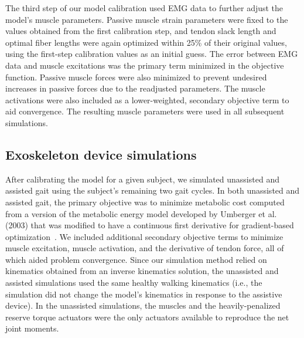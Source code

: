 \documentclass[10pt,letterpaper]{article}
\begin{document}
The third step of our model calibration used EMG data to further adjust the model’s muscle parameters. Passive muscle strain parameters were fixed to the values obtained from the first calibration step, and tendon slack length and optimal fiber lengths were again optimized within 25\% of their original values, using the first-step calibration values as an initial guess. The error between EMG data and muscle excitations was the primary term minimized in the objective function. Passive muscle forces were also minimized to prevent undesired increases in passive forces due to the readjusted parameters. The muscle activations were also included as a lower-weighted, secondary objective term to aid convergence. The resulting muscle parameters were used in all subsequent simulations.

\subsection*{Exoskeleton device simulations}
After calibrating the model for a given subject, we simulated unassisted and assisted gait using the subject’s remaining two gait cycles. In both unassisted and assisted gait, the primary objective was to minimize metabolic cost computed from a version of the metabolic energy model developed by Umberger et al. (2003) that was modified to have a continuous first derivative for gradient-based optimization~\cite{Umberger:2003, Koelewijn:2018}. We included additional secondary objective terms to minimize muscle excitation, muscle activation, and the derivative of tendon force, all of which aided problem convergence. Since our simulation method relied on kinematics obtained from an inverse kinematics solution, the unassisted and assisted simulations used the same healthy walking kinematics (i.e., the simulation did not change the model's kinematics in response to the assistive device). In the unassisted simulations, the muscles and the heavily-penalized reserve torque actuators were the only actuators available to reproduce the net joint moments.
\end{document}
